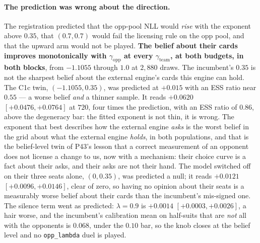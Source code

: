 \documentclass[11pt,letterpaper]{article}
\begin{document}
\paragraph{The prediction was wrong about the direction.} The registration
predicted that the opp-pool NLL would \emph{rise} with the exponent above
$0.35$, that $(0.7, 0.7)$ would fail the licensing rule on the opp pool, and
that the upward arm would not be played. \textbf{The belief about their cards
improves monotonically with $\gamma_{\text{opp}}$ at every
$\gamma_{\text{team}}$, at both budgets, in both blocks}, from $-1.1055$
through $1.0$ at $2{,}880$ draws. The incumbent's $0.35$ is not the sharpest
belief about the external engine's cards this engine can hold. The C1c twin,
$(-1.1055, 0.35)$, was predicted at $+0.015$ with an ESS ratio near $0.55$ ---
a worse belief \emph{and} a thinner sample. It reads $\mathbf{+0.0620}$
$[+0.0476, +0.0764]$ at $720$, four times the prediction, with an ESS ratio of
$\mathbf{0.86}$, above the degeneracy bar: the fitted exponent is not thin, it
is wrong. The exponent that best describes how the external engine \emph{asks} is the worst
belief in the grid about what the external engine \emph{holds}, in both populations, and
that is the belief-level twin of P43's lesson that a correct measurement of an
opponent does not license a change to us, now with a mechanism: their choice
curve is a fact about their asks, and their asks are not their hand. The
model switched off on their three seats alone, $(0, 0.35)$, was predicted a
null; it reads $\mathbf{+0.0121}$ $[+0.0096, +0.0146]$, clear of zero, so
having no opinion about their seats is a measurably worse belief about their
cards than the incumbent's mis-signed one. The silence term went as predicted:
$\lambda = 0.9$ is $\mathbf{+0.0014}$ $[+0.0003, +0.0026]$, a hair worse, and
the incumbent's calibration mean on half-suits that are \emph{not} all with the
opponents is $\mathbf{0.068}$, under the $0.10$ bar, so the knob closes at the
belief level and no \texttt{opp\_lambda} duel is played.
\end{document}
